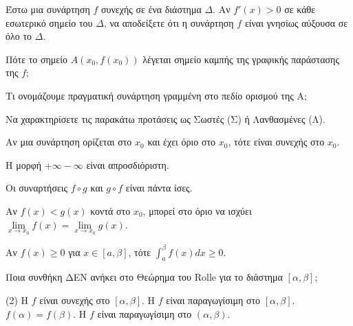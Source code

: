 \documentclass[11pt,a4paper]{article}
\newcommand{\kerkissans}[1]{{\fontfamily{maksf}\selectfont \textbf{#1}}}
\renewcommand{\textdexiakeraia}{}
\newcommand{\dint}{\displaystyle\int}
\newcommand\themanum{A}
\newcounter{thema}[section]
\renewcommand{\thethema}{\arabic{thema}}
\newcommand{\Thema}{\refstepcounter{thema}{\textbf{\textcolor{black}{\faPenSquare\ \  \large \kerkissans{\textbf{\thethemaο\hspace{2mm}Διαγώνισμα - Θέμα \themanum}}}}}\hspace{0mm}}{}
\newenvironment{thema}[1]
{\begin{tcolorbox}[title=\Thema\kerkissans{\textbf{\large{  #1}}},breakable,
enhanced standard,titlerule=0pt,toprule=0pt, rightrule=0pt, bottomrule=0pt,
colback=white,left=0mm,top=1mm,bottom=0mm,
boxrule=0pt,
colframe=white,leftrule=0mm,sharp corners,coltitle=black]
\renewcommand{\themanum}{#1}}
{\end{tcolorbox}}
\begin{document}
\begin{thema}{A}
\begin{erwthma}
    \item Έστω μια συνάρτηση $f$ συνεχής σε ένα διάστημα $\Delta$. Αν $f'(x)>0$ σε κάθε εσωτερικό σημείο του $\Delta$, να αποδείξετε ότι η συνάρτηση $f$ είναι γνησίως αύξουσα σε όλο το $\Delta$.
    \item Πότε το σημείο $A(x_0, f(x_0))$ λέγεται σημείο καμπής της γραφικής παράστασης της $f$;
    \item Τι ονομάζουμε πραγματική συνάρτηση γραμμένη στο πεδίο ορισμού της Α;
    \item Να χαρακτηρίσετε τις παρακάτω προτάσεις ως Σωστές (Σ) ή Λανθασμένες (Λ).
    \begin{alist}
        \item Αν μια συνάρτηση ορίζεται στο $x_0$ και έχει όριο στο $x_0$, τότε είναι συνεχής στο $x_0$.
        \item Η μορφή $+\infty - \infty$ είναι απροσδιόριστη.
        \item Οι συναρτήσεις $f\circ g$ και $g\circ f$ είναι πάντα ίσες.
        \item Αν $f(x)<g(x)$ κοντά στο $x_0$, μπορεί στο όριο να ισχύει $\lim\limits_{x\to x_0} f(x) = \lim\limits_{x\to x_0} g(x)$.
        \item Αν $f(x) \ge 0$ για $x \in [a, \beta]$, τότε $\dint_a^\beta f(x) dx \ge 0$.
    \end{alist}
    \item Ποια συνθήκη ΔΕΝ ανήκει στο Θεώρημα του Rolle για το διάστημα $[\alpha, \beta]$;
    \begin{tasks}[label=\let\textdexiakeraia\relax\alph*.](2)
        \task H $f$ είναι συνεχής στο $[\alpha, \beta]$.
        \task H $f$ είναι παραγωγίσιμη στο $[\alpha, \beta]$.
        \task $f(\alpha) = f(\beta)$.
        \task H $f$ είναι παραγωγίσιμη στο $(\alpha, \beta)$.
    \end{tasks}
\end{erwthma}
\end{thema}
\vspace{1cm}
\end{document}
